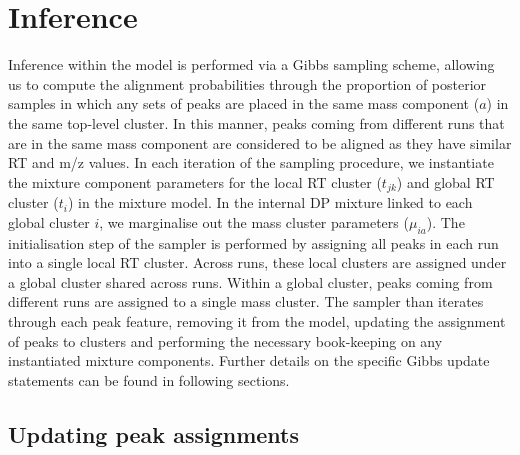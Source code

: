 \section{Inference}

Inference within the model is performed via a Gibbs sampling scheme, allowing us to compute the alignment probabilities through the proportion of posterior samples in which any sets of peaks are placed in the same mass component ($a$) in the same top-level cluster. In this manner, peaks coming from different runs that are in the same mass component are considered to be aligned as they have similar RT and m/z values. In each iteration of the sampling procedure, we instantiate the mixture component parameters for the local RT cluster ($t_{jk}$) and global RT cluster ($t_{i}$) in the mixture model. In the internal DP mixture linked to each global cluster $i$, we marginalise out the mass cluster parameters ($\mu_{ia}$). The initialisation step of the sampler is performed by assigning all peaks in each run into a single local RT cluster. Across runs, these local clusters are assigned under a global cluster shared across runs. Within a global cluster, peaks coming from different runs are assigned to a single mass cluster. The sampler than iterates through each peak feature, removing it from the model, updating the assignment of peaks to clusters and performing the necessary book-keeping on any instantiated mixture components. Further details on the specific Gibbs update statements can be found in following sections.

\subsection{Updating peak assignments}

